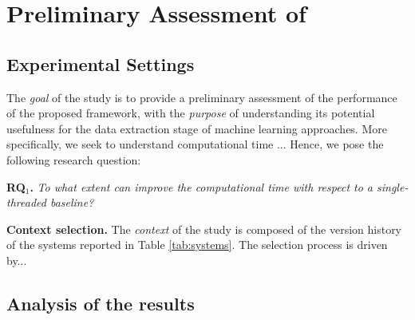 
\section{Preliminary Assessment of \iris}
\label{sec:assessment}

\subsection{Experimental Settings}
\label{sec:method}
The \emph{goal} of the study is to provide a preliminary assessment of the performance of the proposed framework, with the \emph{purpose} of understanding its potential usefulness for the data extraction stage of machine learning approaches. More specifically, we seek to understand computational time ... Hence, we pose the following research question:

\begin{center}
	\begin{examplebox}
		\textbf{RQ$_1$.} \emph{To what extent can \iris improve the computational time with respect to a single-threaded baseline?}	
	\end{examplebox}
\end{center}

\textbf{Context selection.} The \emph{context} of the study is composed of the version history of the systems reported in Table \ref{tab:systems}. The selection process is driven by... 


\subsection{Analysis of the results}
\label{sec:results}


